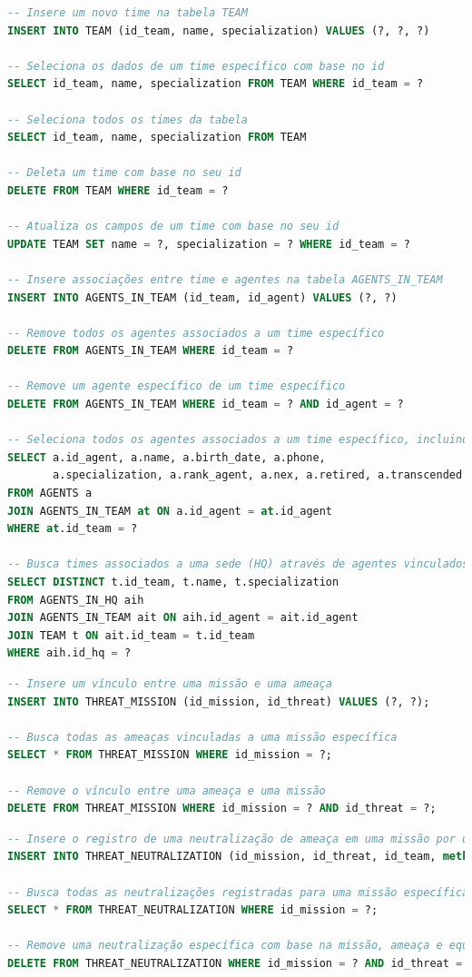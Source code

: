 \documentclass[12pt,a4paper]{report}
\begin{document}
\begin{lstlisting}[language=SQL, caption=Consultas feitas em TeamDAO]
-- Insere um novo time na tabela TEAM
INSERT INTO TEAM (id_team, name, specialization) VALUES (?, ?, ?)

-- Seleciona os dados de um time específico com base no id
SELECT id_team, name, specialization FROM TEAM WHERE id_team = ?

-- Seleciona todos os times da tabela
SELECT id_team, name, specialization FROM TEAM

-- Deleta um time com base no seu id
DELETE FROM TEAM WHERE id_team = ?

-- Atualiza os campos de um time com base no seu id
UPDATE TEAM SET name = ?, specialization = ? WHERE id_team = ?

-- Insere associações entre time e agentes na tabela AGENTS_IN_TEAM
INSERT INTO AGENTS_IN_TEAM (id_team, id_agent) VALUES (?, ?)

-- Remove todos os agentes associados a um time específico
DELETE FROM AGENTS_IN_TEAM WHERE id_team = ?

-- Remove um agente específico de um time específico
DELETE FROM AGENTS_IN_TEAM WHERE id_team = ? AND id_agent = ?

-- Seleciona todos os agentes associados a um time específico, incluindo detalhes dos agentes
SELECT a.id_agent, a.name, a.birth_date, a.phone,
       a.specialization, a.rank_agent, a.nex, a.retired, a.transcended
FROM AGENTS a
JOIN AGENTS_IN_TEAM at ON a.id_agent = at.id_agent
WHERE at.id_team = ?

-- Busca times associados a uma sede (HQ) através de agentes vinculados a ela
SELECT DISTINCT t.id_team, t.name, t.specialization
FROM AGENTS_IN_HQ aih
JOIN AGENTS_IN_TEAM ait ON aih.id_agent = ait.id_agent
JOIN TEAM t ON ait.id_team = t.id_team
WHERE aih.id_hq = ?
\end{lstlisting}
\begin{lstlisting}[language=SQL, caption=Consultas feitas em ThreatMissionDAO]
-- Insere um vínculo entre uma missão e uma ameaça
INSERT INTO THREAT_MISSION (id_mission, id_threat) VALUES (?, ?);

-- Busca todas as ameaças vinculadas a uma missão específica
SELECT * FROM THREAT_MISSION WHERE id_mission = ?;

-- Remove o vínculo entre uma ameaça e uma missão
DELETE FROM THREAT_MISSION WHERE id_mission = ? AND id_threat = ?;
\end{lstlisting}

\begin{lstlisting}[language=SQL, caption=Consultas feitas em ThreatNeutralizationDAO]
-- Insere o registro de uma neutralização de ameaça em uma missão por uma equipe
INSERT INTO THREAT_NEUTRALIZATION (id_mission, id_threat, id_team, method, result) VALUES (?, ?, ?, ?, ?);

-- Busca todas as neutralizações registradas para uma missão específica
SELECT * FROM THREAT_NEUTRALIZATION WHERE id_mission = ?;

-- Remove uma neutralização específica com base na missão, ameaça e equipe
DELETE FROM THREAT_NEUTRALIZATION WHERE id_mission = ? AND id_threat = ? AND id_team;
\end{lstlisting}
\end{document}
